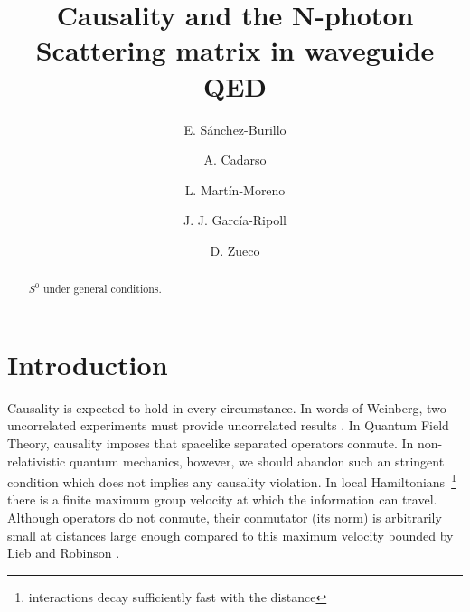 \documentclass[notitlepage, prx, preprint, amsmath,superscriptaddress,amssymb]{revtex4-1}
\begin{document}
\title{Causality and the N-photon Scattering matrix in waveguide QED}

\author{E. S\'anchez-Burillo}

\author{A. Cadarso}

\author{L. Mart\'in-Moreno}

\author{J. J. Garc\'ia-Ripoll}

\author{D. Zueco}



\begin{abstract}
$S^0$ under general conditions.
\end{abstract}



\maketitle


\section{Introduction}

Causality is  expected to hold in every circumstance.    In words of Weinberg, two uncorrelated experiments must provide uncorrelated results \cite[Chap. 4]{weinberg1995}.     In Quantum Field Theory, causality imposes that  spacelike separated operators conmute.   In non-relativistic quantum mechanics, however, we should abandon such an stringent condition which  does not implies any causality violation.  In local Hamiltonians~\footnote{interactions decay sufficiently fast with the distance} there is a finite maximum  group velocity at which the information can travel.   Although operators do not conmute,  their conmutator  (its norm) is arbitrarily small at distances large enough compared to this maximum velocity  bounded by Lieb and Robinson \cite{Lieb1972}.  
\end{document}
